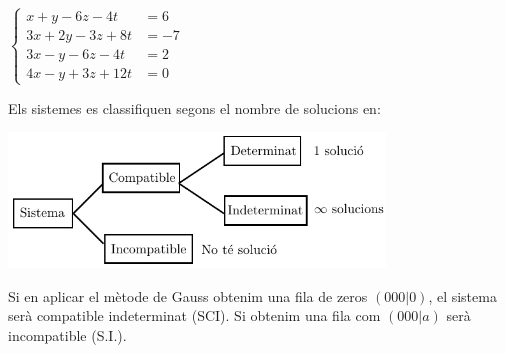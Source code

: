 \begin{mylist}
\begin{tasks}
	\task $\left\{\begin{array}{ll} x+y-6z-4t&=6 \\ 3x+2y-3z+8t&=-7 \\ 3x-y-6z-4t&=2 \\ 4x-y+3z+12t&=0 \end{array}\right.$ 
	\end{tasks}

 
\begin{theorybox}
	Els sistemes es classifiquen segons el nombre de solucions en:
	\begin{center}
		\includegraphics[width=10cm]{img-02/classificacio-sistemes.pdf}
	\end{center}

Si en aplicar el mètode de Gauss obtenim una fila de zeros $(0 0 0 | 0)$, el sistema serà compatible indeterminat (SCI). Si obtenim  una fila com  $(0 0 0 | a)$ serà incompatible (S.I.).
\end{theorybox}


\end{mylist}
